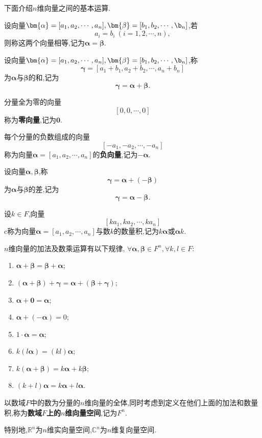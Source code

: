 \documentclass[9pt,a4paper]{book}
\begin{document}
下面介绍$ n $维向量之间的基本运算.
\begin{defination}[向量相等]
	设向量$ \bm{\alpha}=[a_1,a_2,\cdots,a_n],\bm{\beta}=[b_1,b_2,\cdots,\b_n] $,若\[ a_i=b_i\ (i=1,2,\cdots,n), \]则称这两个向量相等,记为$ \bm{\alpha}=\bm{\beta}$.
\end{defination}
\begin{defination}[向量的和]
	设向量$ \bm{\alpha}=[a_1,a_2,\cdots,a_n],\bm{\beta}=[b_1,b_2,\cdots,\b_n] $,称\[ \bm{\gamma}=[a_1+b_1,a_2+b_2,\cdots,a_n+b_n]\]为$ \bm{\alpha} $与$ \bm{\beta} $的和,记为\[ \bm{\gamma}=\bm{\alpha}+\bm{\beta}. \]
\end{defination}
\begin{defination}[零向量]
	分量全为零的向量\[ [0,0,\cdots,0] \]称为\textbf{零向量},记为$ \bm{0} $.
\end{defination}
\begin{defination}[负向量]
	每个分量的负数组成的向量\[ [-a_1,-a_2,\cdots,-a_n] \]称为向量$ \bm{\alpha}=[a_1,a_2,\cdots,a_n]$的\textbf{负向量},记为$ -\bm{\alpha} $.
\end{defination}
\begin{defination}[向量的差]
	设向量$ \bm{\alpha},\bm{\beta} $,称\[ \bm{\gamma}=\bm{\alpha}+(-\bm{\beta})\]为$ \bm{\alpha} $与$ \bm{\beta} $的差,记为\[ \bm{\gamma}=\bm{\alpha}-\bm{\beta}. \]
\end{defination}
\begin{defination}[向量的数量积]
	设$ k\in F $,向量\[ [ka_1,ka_2,\cdots,ka_n] \]c称为向量$ \bm{\alpha}=[a_1,a_2,\cdots,a_n]$与数$ k $的数量积,记为$ k\bm{\alpha} $或$ \bm{\alpha}k $.
\end{defination}
\begin{theorem}[向量线性运算规律]
	$ n $维向量的加法及数乘运算有以下规律,
	$\forall \bm{\alpha},\bm{\beta}\in F^n ,\forall k,l\in F$:
\begin{multicols}{2}
	\begin{enumerate}
		\item $\bm{\alpha}+\bm{\beta}=\bm{\beta}+\bm{\alpha} $;
		\item $ (\bm{\alpha}+\bm{\beta})+\bm{\gamma}=\bm{\alpha}+(\bm{\beta}+\bm{\gamma}) $;
		\item $ \bm{\alpha}+\bm{0}=\bm{\alpha} $;
		\item $ \bm{\alpha}+(-\bm{\alpha})=0 $;
		\item $ 1\cdot\bm{\alpha}=\bm{\alpha} $;
		\item $ k(l\bm{\alpha})=(kl)\bm{\alpha} $;
		\item $ k(\bm{\alpha}+\bm{\beta})=k\bm{\alpha}+k\bm{\beta} $;
		\item $(k+l)\bm{\alpha}=k\bm{\alpha}+l\bm{\alpha}  $.
	\end{enumerate}
\end{multicols}
\end{theorem}
\begin{defination}[$ n $维向量空间]
	以数域$ F $中的数为分量的$ n $维向量的全体,同时考虑到定义在他们上面的加法和数量积,称为\textbf{数域$ F $上的$ n $维向量空间},记为$ F^n $.
	
	特别地,$ \mathbb{R}^n $为$ n $维实向量空间,$ \mathbb{C}^n $为$ n $维复向量空间.
\end{defination}
\end{document}
